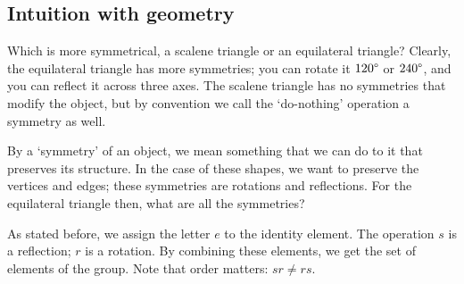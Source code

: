 \subsection{Intuition with geometry}
Which is more symmetrical, a scalene triangle or an equilateral triangle?
Clearly, the equilateral triangle has more symmetries; you can rotate it \(120\degree\) or \(240\degree\), and you can reflect it across three axes.
The scalene triangle has no symmetries that modify the object, but by convention we call the `do-nothing' operation a symmetry as well.

By a `symmetry' of an object, we mean something that we can do to it that preserves its structure.
In the case of these shapes, we want to preserve the vertices and edges; these symmetries are rotations and reflections.
For the equilateral triangle then, what are all the symmetries?


As stated before, we assign the letter \(e\) to the identity element.
The operation \(s\) is a reflection; \(r\) is a rotation.
By combining these elements, we get the set of elements of the group.
Note that order matters: \(sr\neq rs\).

